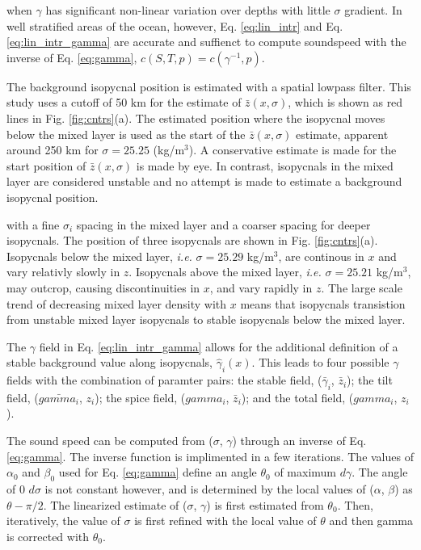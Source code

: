 \documentclass[preprint,NumberedRefs]{JASA}
\begin{document}
when $\gamma$ has significant non-linear variation over depths with little $\sigma$ gradient. In well stratified areas of the ocean, however, Eq. \ref{eq:lin_intr} and Eq. \ref{eq:lin_intr_gamma} are accurate and suffienct to compute soundspeed with the inverse of Eq. \eqref{eq:gamma}, $c(S, T, p)=c(\gamma^{-1}, p)$.

The background isopycnal position is estimated with a spatial lowpass filter. This study uses a cutoff of 50 km for the estimate of $\bar{z}(x, \sigma)$, which is shown as red lines in Fig. \ref{fig:cntrs}(a). The estimated position where the isopycnal moves below the mixed layer is used as the start of the $\bar{z}(x, \sigma)$ estimate, apparent around 250 km for $\sigma=25.25$ (kg/m$^3$). A conservative estimate is made for the start position of $\bar{z}(x, \sigma)$ is made by eye. In contrast, isopycnals in the mixed layer are considered unstable and no attempt is made to estimate a background isopycnal position.

with a fine $\sigma_i$ spacing in the mixed layer and a coarser spacing for deeper isopycnals. The position of three isopycnals are shown in Fig. \ref{fig:cntrs}(a). Isopycnals below the mixed layer, \emph{i.e.} $\sigma = 25.29$ kg/m$^3$, are continous in $x$ and vary relativly slowly in $z$. Isopycnals above the mixed layer, \emph{i.e.} $\sigma = 25.21$ kg/m$^3$, may outcrop, causing discontinuities in $x$, and vary rapidly in $z$. The large scale trend of decreasing mixed layer density with $x$ means that isopycnals transistion from unstable mixed layer isopycnals to stable isopycnals below the mixed layer.

The $\gamma$ field in Eq. \eqref{eq:lin_intr_gamma} allows for the additional definition of a stable background value along isopycnals, $\hat{\gamma}_i(x)$. This leads to four possible $\gamma$ fields with the combination of paramter pairs: the stable field, ($\bar{\gamma}_i$, $\bar{z}_i$); the tilt field, ($\bar{gamma_i}$, $z_i$); the spice field, ($gamma_i$, $\bar{z}_i$); and the total field, ($gamma_i$, $z_i$).

The sound speed can be computed from ($\sigma$, $\gamma$) through an inverse of Eq. \eqref{eq:gamma}. The inverse function is implimented in a few iterations. The values of $\alpha_0$ and $\beta_0$ used for Eq. \eqref{eq:gamma} define an angle $\theta_0$ of maximum $d\gamma$. The angle of 0 $d\sigma$ is not constant however, and is determined by the local values of ($\alpha$, $\beta$) as $\theta - \pi / 2$. The linearized estimate of ($\sigma$, $\gamma$) is first estimated from $\theta_0$. Then, iteratively, the value of $\sigma$ is first refined with the local value of $\theta$ and then gamma is corrected with $\theta_0$.
\end{document}
